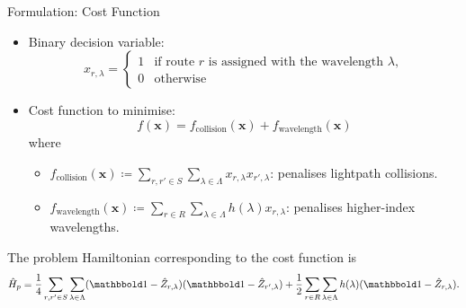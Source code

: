 \begin{frame}{Formulation: Cost Function}
\begin{itemize}
    \item Binary decision variable:
    \[
      x_{r,\lambda} =
      \begin{cases}
      1 & \text{if route $r$ is assigned with the wavelength $\lambda$},\\
      0 & \text{otherwise}
      \end{cases}
    \]
    \item Cost function to minimise:
    \[
      f(\boldsymbol{x}) = f_{\text{collision}}(\boldsymbol{x})
      + f_{\text{wavelength}}(\boldsymbol{x})
    \]
    where
    \begin{itemize}
    \scriptsize
        \item $\displaystyle f_{\text{collision}}(\boldsymbol{x}) \coloneq \sum_{r,r' \in S} \sum_{\lambda \in \Lambda} x_{r,\lambda}x_{r',\lambda}$: penalises lightpath collisions.
        \item $\displaystyle
	f_{\text{wavelength}}(\boldsymbol{x}) \coloneq 
	\sum_{r \in R} \sum_{\lambda \in \Lambda} h(\lambda) x_{r,\lambda}
$: penalises higher-index wavelengths.
    \end{itemize}
\end{itemize}
The problem Hamiltonian corresponding to the cost function is
\begin{align}
	\hat{H}_{p} = 
	\frac{1}{4}\sum_{r,r' \in S} \sum_{\lambda \in \Lambda} (\identity-\hat{Z}_{r,\lambda})(\identity-\hat{Z}_{r',\lambda}) +
	\frac{1}{2}\sum_{r \in R} \sum_{\lambda \in \Lambda} h(\lambda) (\identity-\hat{Z}_{r,\lambda}). \label{eq:rwaproblemhamiltonian}
\end{align}
\end{frame}

